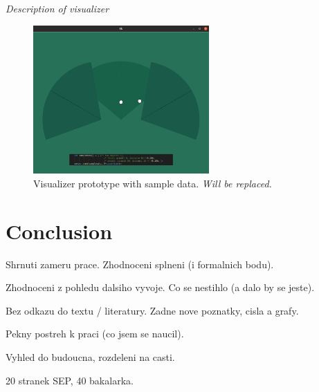 {\it Description of visualizer}

\begin{figure}[h!]
\begin{center}
\includegraphics[width=0.6\textwidth]{img/visualizer.png}
\caption{Visualizer prototype with sample data. {\it Will be replaced.} \label{fig:visualizer}}
\end{center}
\end{figure}






\chapter{Conclusion}
Shrnuti zameru prace. Zhodnoceni splneni (i formalnich bodu).

Zhodnoceni z pohledu dalsiho vyvoje. Co se nestihlo (a dalo by se jeste).

Bez odkazu do textu / literatury. Zadne nove poznatky, cisla a grafy.

Pekny postreh k praci (co jsem se naucil).

Vyhled do budoucna, rozdeleni na casti.

20 stranek SEP, 40 bakalarka.




